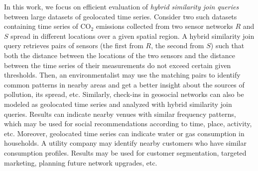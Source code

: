 
In this work, we focus on efficient evaluation of {\em hybrid similarity join queries} between large datasets of geolocated time series. Consider two such datasets containing time series of CO$_2$ emissions collected from two sensor networks $R$ and $S$ spread in different locations over a given spatial region. A hybrid similarity join query retrieves pairs of sensors (the first from $R$, the second from $S$) such that both the distance between the locations of the two sensors and the distance between the time series of their measurements do not exceed certain given thresholds. Then, an environmentalist may use the matching pairs to identify common patterns in nearby areas and get a better insight about the sources of pollution, its spread, etc. Similarly, check-ins in geosocial networks can also be modeled as geolocated time series and analyzed with hybrid similarity join queries. Results can indicate nearby venues with similar frequency patterns, which may be used for social recommendations according to time, place, activity, etc. Moreover, geolocated time series can indicate water or gas consumption in households. A utility company may identify nearby customers who have similar consumption profiles. Results may be used for customer segmentation, targeted marketing, planning future network upgrades, etc.

